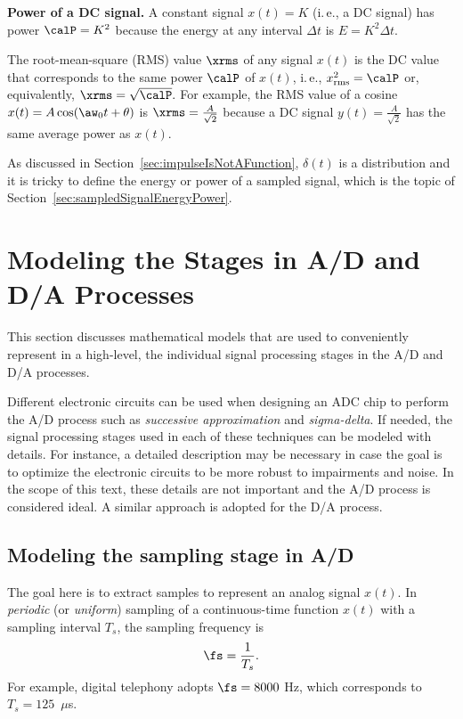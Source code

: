 \bExample \textbf{Power of a DC signal.}
A constant signal $x(t) = K$ (i.\,e., a DC signal) has power $\calP = K^2$ because the energy at any interval $\Delta t$ is $E = K^2 \Delta t$. 
\eExample

The root-mean-square (RMS) value $\xrms$ of any signal $x(t)$ is the DC value that corresponds to the same power $\calP$ of $x(t)$, i.\,e., $x^2_{\textrm{rms}} = \calP$ or, equivalently, $\xrms = \sqrt{\calP}.$ For example, the RMS value of a cosine $x(t)=A \cos (\aw_0 t + \theta)$ is $\xrms = \frac{A}{\sqrt{2}}$ because a DC signal $y(t) = \frac{A}{\sqrt{2}}$ has the same average power as $x(t)$.

As discussed in Section~\ref{sec:impulseIsNotAFunction},  $\delta(t)$ is a distribution and it is tricky to define the energy or power of a sampled signal, which is the topic of Section~\ref{sec:sampledSignalEnergyPower}.

\section{Modeling the Stages in A/D and D/A Processes}
\label{sec:addaprocesses}

This section discusses mathematical models that are used to conveniently represent in a high-level, the individual signal processing stages in the A/D and D/A processes.

Different electronic circuits can be used when designing an ADC chip to perform the A/D process such as \emph{successive approximation} and \emph{sigma-delta}. If needed, the signal processing stages used in each of these techniques can be modeled with details. For instance, a detailed description may be necessary in case the goal is to optimize the electronic circuits to be more robust to impairments and noise. In the scope of this text, these details are not important and the A/D process is considered ideal. A similar approach is adopted for the D/A process. 

\subsection{Modeling the sampling stage in A/D}
\label{sec:sampling_stage}

The goal here is to extract samples to represent an analog signal $x(t)$.
In \emph{periodic} (or \emph{uniform}) sampling  of a continuous-time function $x(t)$  with a sampling interval $T_s$, the sampling frequency is
\begin{equation}
\fs = \frac{1}{T_s}.
\label{eq:samplingFrequency}
\end{equation}
For example, digital telephony adopts $\fs = 8000$ Hz, which corresponds to $T_s = 125$~$\mu$s. 

